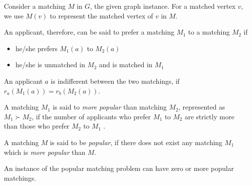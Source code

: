 \documentclass{llncs}
\begin{document}
Consider a matching $M$ in $G$, the given graph instance. For a matched vertex $v$, we use $M(v)$ to represent the matched vertex of $v$ in $M$. 

An applicant, therefore, can be said to prefer a matching $M_1$ to a matching $M_2$ if 
\begin{itemize}
\item he/she prefers $M_1(a)$ to  $M_2(a)$
\item he/she is unmatched in $M_2$ and is matched in $M_1$
\end{itemize}

An applicant $a$ is indifferent between the two matchings, if  $r_a(M_1(a)) = r_b(M_2(a))$.

A matching $M_1$ is said to \emph{more popular} than matching $M_2$, represented as $M_1 \succ M_2$, if the number of applicants who prefer $M_1$ to $M_2$ are strictly more than those who prefer $M_2$ to $M_1$ .  


A matching $M$ is said to be \emph{popular}, if there does not exist any matching $M_1$ which is \emph{more popular} than $M$.  

An instance of the popular matching problem can have zero or more popular matchings. 
\end{document}
